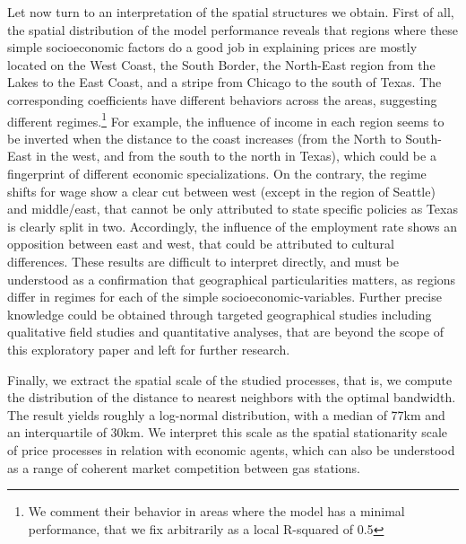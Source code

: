 \documentclass[10pt]{article}
\begin{document}
Let now turn to an interpretation of the spatial structures we obtain. First of all, the spatial distribution of the model performance reveals that regions where these simple socioeconomic factors do a good job in explaining prices are mostly located on the West Coast, the South Border, the North-East region from the Lakes to the East Coast, and a stripe from Chicago to the south of Texas. The corresponding coefficients have different behaviors across the areas, suggesting different regimes.\footnote{We comment their behavior in areas where the model has a minimal performance, that we fix arbitrarily as a local R-squared of 0.5} For example, the influence of income in each region seems to be inverted when the distance to the coast increases (from the North to South-East in the west, and from the south to the north in Texas), which could be a fingerprint of different economic specializations. On the contrary, the regime shifts for wage show a clear cut between west (except in the region of Seattle) and middle/east, that cannot be only attributed to state specific policies as Texas is clearly split in two. Accordingly, the influence of the employment rate shows an opposition between east and west, that could be attributed to cultural differences. These results are difficult to interpret directly, and must be understood as a confirmation that geographical particularities matters, as regions differ in regimes for each of the simple socioeconomic-variables. Further precise knowledge could be obtained through targeted geographical studies including qualitative field studies and quantitative analyses, that are beyond the scope of this exploratory paper and left for further research.

Finally, we extract the spatial scale of the studied processes, that is, we compute the distribution of the distance to nearest neighbors with the optimal bandwidth. The result yields roughly a log-normal distribution, with a median of 77km and an interquartile of 30km. We interpret this scale as the spatial stationarity scale of price processes in relation with economic agents, which can also be understood as a range of coherent market competition between gas stations.
\end{document}
